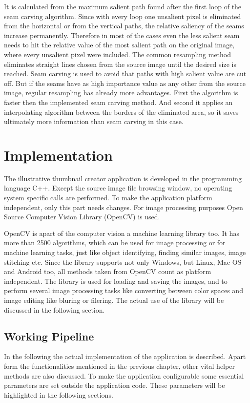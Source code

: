 \documentclass[draft,final]{vutinfth} %
\begin{document}
It is calculated from the maximum salient path found after the first loop of the seam carving algorithm.
Since with every loop one unsalient pixel is eliminated from the horizontal or from the vertical paths, the relative saliency of the seams increase permanently.
Therefore in most of the cases even the less salient seam needs to hit the relative value of the most salient path on the original image, where every unsalient pixel were included. 
The common resampling method eliminates straight lines chosen from the source image until the desired size is reached.
Seam carving is used to avoid that paths with high salient value are cut off.
But if the seams have as high importance value as any other from the source image, regular resampling has already more advantages.
First the algorithm is faster then the implemented seam carving method.
And second it applies an interpolating algorithm between the borders of the eliminated area, so it saves ultimately more information than seam carving in this case.   

\chapter{Implementation}
The illustrative thumbnail creator application is developed in the programming language C++.
Except the source image file browsing window, no operating system specific calls are performed.
To make the application platform independent, only this part needs changes.
For image processing purposes Open Source Computer Vision Library (OpenCV) is used.\par 
OpenCV is apart of the computer vision a machine learning library too.     
It has more than 2500 algorithms, which can be used for image processing or for machine learning tasks, just like object identifying, finding similar images, image stitching etc.
Since the library supports not only Windows, but Linux, Mac OS and Android too, all methods taken from OpenCV count as platform independent.
The library is used for loading and saving the images, and to perform several image processing tasks like converting between color spaces and image editing like bluring or filering.
The actual use of the library will be discussed in the following section.

\section{Working Pipeline}
In the following the actual implementation of the application is described.
Apart form the functionalities mentioned in the previous chapter, other vital helper methods are also discussed.
To make the application configurable some essential parameters are set outside the application code. These parameters will be highlighted in the following sections.
\end{document}
